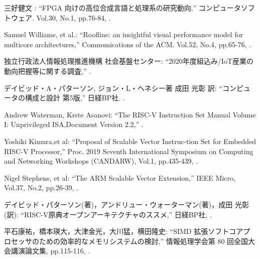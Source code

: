 {\small 三好健文 : %
\newblock ``FPGA 向けの高位合成言語と処理系の研究動向,''
\newblock コンピュータソフトウェア. 
\newblock Vol.30,
\newblock No.1,
\newblock pp.76-84,
.}

{\small Samuel Williams, et al.: %
\newblock ``Roofline: an insightful visual performance model for multicore architectures,''
\newblock Communications of the ACM. 
\newblock Vol.52,
\newblock No.4,
\newblock pp.65-76,
.}

{\small 独立行政法人情報処理推進機構 社会基盤センター: %
\newblock ``2020年度組込み/IoT産業の動向把握等に関する調査,''
.}

{\small デイビッド・A・パターソン, ジョン・L・ヘネシー著 成田 光彰 訳: %
\newblock ``コンピュータの構成と設計 第5版,''
\newblock 日経BP社. 
.}

{\small Andrew Waterman, Krste Asanovi:      %
\newblock ``The RISC-V Instruction Set Manual Volume I: Unprivileged ISA,Document Version 2.2,''
.}

{\small Yoshiki Kimura,et al:      %
\newblock ``Proposal of Scalable Vector Instruc-tion Set for Embedded RISC-V Processor,''
\newblock Proc. 2019 Seventh International Symposium on Computing and Networking Workshops (CANDARW),
\newblock Vol.1,
\newblock pp.435-439,
.}

{\small Nigel Stephens, et al:      %
\newblock ``The ARM Scalable Vector Extension,''
\newblock IEEE Micro,
\newblock Vol.37,
\newblock No.2,
\newblock pp.26-39,
.}

{\small デイビッド・パターソン(著)，アンドリュー・ウォーターマン(著)，成田 光彰(訳):      %
\newblock ``RISC-V原典オープンアーキテクチャのススメ,''
\newblock 日経BP社,
.}

{\small 平石康祐，橋本瑛大，大津金光，大川猛，横田隆史:      %
\newblock ``SIMD 拡張ソフトコアプロセッサのための効率的なメモリシステムの検討,''
\newblock 情報処理学会第 80 回全国大会講演論文集,
\newblock pp.115-116,
.}
